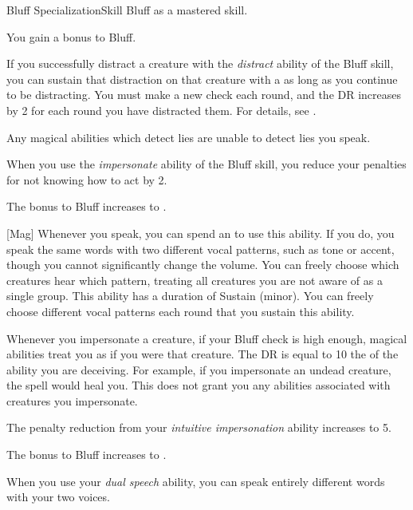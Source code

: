     \begin{feat}{Bluff Specialization}{Skill}
        \featpre Bluff as a mastered skill.
        \featben

         You gain a  bonus to Bluff.

         If you successfully distract a creature with the \textit{distract} ability of the Bluff skill, you can sustain that distraction on that creature with a  as long as you continue to be distracting.
        You must make a new check each round, and the DR increases by 2 for each round you have distracted them.
        For details, see .

         Any magical abilities which detect lies are unable to detect lies you speak.

         When you use the \textit{impersonate} ability of the Bluff skill, you reduce your penalties for not knowing how to act by 2.


         The bonus to Bluff increases to .

        [Mag] Whenever you speak, you can spend an  to use this ability.
        If you do, you speak the same words with two different vocal patterns, such as tone or accent, though you cannot significantly change the volume.
        You can freely choose which creatures hear which pattern, treating all creatures you are not aware of as a single group.
        This ability has a duration of Sustain (minor).
        You can freely choose different vocal patterns each round that you sustain this ability.

         Whenever you impersonate a creature, if your Bluff check is high enough, magical abilities treat you as if you were that creature.
        The DR is equal to 10 \add the  of the ability you are deceiving.
        For example, if you impersonate an undead creature, the  spell would heal you.
        This does not grant you any abilities associated with creatures you impersonate.

         The penalty reduction from your \textit{intuitive impersonation} ability increases to 5.

         The bonus to Bluff increases to .

         When you use your \textit{dual speech} ability, you can speak entirely different words with your two voices.
    \end{feat}


